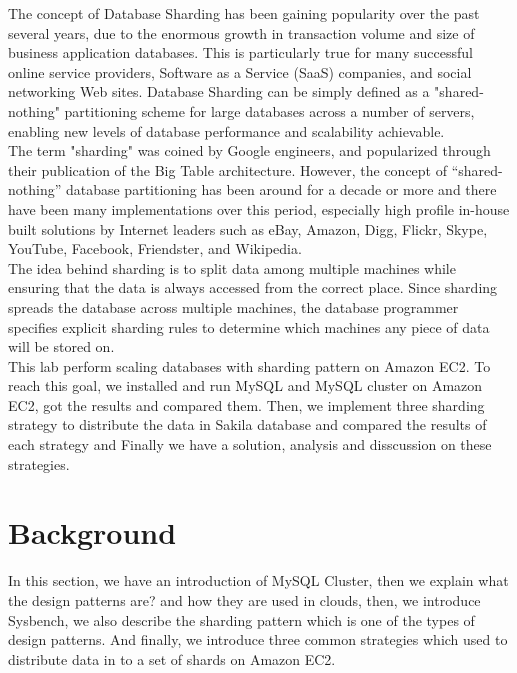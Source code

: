 \documentclass[10pt, conference]{IEEEtran}
\begin{document}
\indent The concept of Database Sharding has been gaining popularity over the past several years, due to the enormous growth in transaction volume and size of business application databases. This is particularly true for many successful online service providers, Software as a Service (SaaS) companies, and social networking Web sites. Database Sharding can be simply defined as a "shared-nothing" partitioning scheme for large databases across a number of servers, enabling new levels of database performance and scalability achievable. \\
\indent The term "sharding" was coined by Google engineers, and popularized through their publication of the Big Table architecture. However, the concept of “shared-nothing” database partitioning has been around for a decade or more and there have been many implementations over this period, especially high profile in-house built solutions by Internet leaders such as eBay, Amazon, Digg, Flickr, Skype, YouTube, Facebook, Friendster, and Wikipedia.\\
\indent The idea behind sharding is to split data among multiple machines while ensuring that the data is always accessed from the correct place. Since sharding spreads the database across multiple machines, the database programmer specifies explicit sharding rules to determine which machines any piece of data will be stored on.\\
\indent This lab perform scaling databases with sharding pattern on Amazon EC2. To reach this goal, we installed and run MySQL and MySQL cluster on Amazon EC2, got the results and compared them. Then, we implement three sharding strategy to distribute the data in Sakila database and compared the results of each strategy and Finally we have a solution, analysis and disscussion on these strategies. 


\section{Background}
\indent In this section, we have an introduction of MySQL Cluster, then we explain what the design patterns are? and how they are used in clouds, then, we introduce Sysbench, we also describe the sharding pattern which is one of the types of design patterns. And finally, we introduce three common strategies which used to distribute data in to a set of shards on Amazon EC2.
\end{document}
